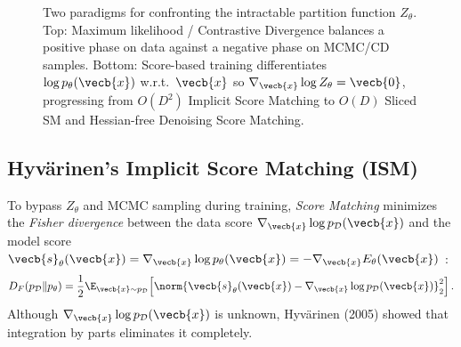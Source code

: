 \documentclass[../../../../master.tex]{subfiles}
\begin{document}
\begin{figure}[htbp]
{%
  }
  \caption{Two paradigms for confronting the intractable partition function $Z_\theta$. Top: Maximum likelihood / Contrastive Divergence balances a positive phase on data against a negative phase on MCMC/CD samples. Bottom: Score-based training differentiates $\log p_\theta(\vecb{x})$ w.r.t.\ $\vecb{x}$ so $\nabla_{\vecb{x}} \log Z_\theta = \vecb{0}$, progressing from $O(D^2)$ Implicit Score Matching to $O(D)$ Sliced SM and Hessian-free Denoising Score Matching.}
  \label{fig:ebm:pos_neg_phase}
\end{figure}

\subsection{Hyv\"arinen's Implicit Score Matching (ISM)}
\label{sec:ebm:ism}

To bypass $Z_\theta$ and MCMC sampling during training, \emph{Score Matching} minimizes the \emph{Fisher divergence} between the data score $\nabla_{\vecb{x}} \log p_{\mathcal{D}}(\vecb{x})$ and the model score $\vecb{s}_\theta(\vecb{x}) = \nabla_{\vecb{x}} \log p_\theta(\vecb{x}) = -\nabla_{\vecb{x}} E_\theta(\vecb{x})$ :
\begin{equation}
  D_F(p_{\mathcal{D}} \| p_\theta) = \frac{1}{2} \E_{\vecb{x} \sim p_{\mathcal{D}}}\!\left[ \norm{\vecb{s}_\theta(\vecb{x}) - \nabla_{\vecb{x}} \log p_{\mathcal{D}}(\vecb{x})}_2^2 \right].
  \label{eq:ebm:fisher_div}
\end{equation}
Although $\nabla_{\vecb{x}} \log p_{\mathcal{D}}(\vecb{x})$ is unknown, Hyv\"arinen (2005) showed that integration by parts eliminates it completely.
\end{document}
